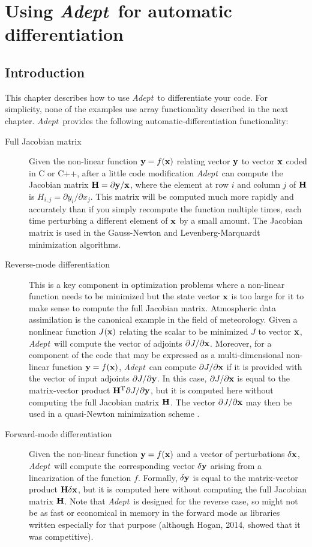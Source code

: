\documentclass[a4,oneside]{book}
\def\x{\ensuremath{{\bf x}}}
\def\y{\ensuremath{{\bf y}}}
\def\H{\ensuremath{{\bf H}}}
\def\T{\ensuremath{^\mathrm{T}}}
\def\Adept{\emph{Adept}}
\begin{document}
\chapter{Using \Adept\ for automatic differentiation}
\label{chap:ad}
%
\section{Introduction}
\label{sec:ad_functionality}
This chapter describes how to use \Adept\ to differentiate your code.
For simplicity, none of the examples use array functionality described
in the next chapter. \Adept\ provides the following
automatic-differentiation functionality:
%
\begin{description}
\item[Full Jacobian matrix] Given the non-linear function $\y=f(\x)$
  relating vector $\y$ to vector $\x$ coded in C or C++, after a
  little code modification \Adept\ can compute the Jacobian matrix
  $\H=\partial\y/\x$, where the element at row $i$ and column $j$ of
  $\H$ is $H_{i,j}=\partial y_i/\partial x_j$. This matrix will be
  computed much more rapidly and accurately than if you simply
  recompute the function multiple times, each time perturbing a
  different element of $\x$ by a small amount. The Jacobian matrix is
  used in the Gauss-Newton and Levenberg-Marquardt minimization
  algorithms.
\item[Reverse-mode differentiation] This is a key component in
  optimization problems where a non-linear function needs to be
  minimized but the state vector $\x$ is too large for it to make
  sense to compute the full Jacobian matrix. Atmospheric data
  assimilation is the canonical example in the field of
  meteorology. Given a nonlinear function $J(\x)$ relating the
  scalar to be minimized $J$ to vector $\x$, \Adept\ will compute the
  vector of adjoints $\partial J/\partial\x$. Moreover, for a
  component of the code that may be expressed as a multi-dimensional
  non-linear function $\y=f(\x)$, \Adept\ can compute $\partial
  J/\partial\x$ if it is provided with the vector of input adjoints
  $\partial J/\partial\y$.  In this case, $\partial J/\partial\x$ is
  equal to the matrix-vector product $\H\T\partial J/\partial\y$, but
  it is computed here without computing the full Jacobian matrix
  $\H$. The vector $\partial J/\partial\x$ may then be used in a
  quasi-Newton minimization scheme \cite[e.g.,][]{Liu+1989}.
\item[Forward-mode differentiation] Given the non-linear function
  $\y=f(\x)$ and a vector of perturbations $\delta\x$, \Adept\ will
  compute the corresponding vector $\delta\y$ arising from a
  linearization of the function $f$. Formally, $\delta\y$ is equal
  to the matrix-vector product $\H\delta\x$, but it is computed here
  without computing the full Jacobian matrix $\H$. Note that
  \Adept\ is designed for the reverse case, so might not be as fast
  or economical in memory in the forward mode as libraries written
  especially for that purpose (although Hogan, 2014, showed that it
  was competitive).
\end{description}%
\end{document}
